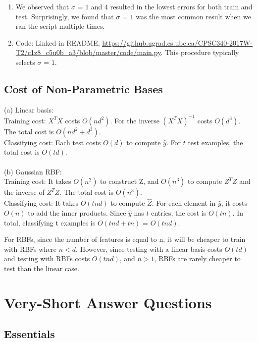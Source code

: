 \documentclass{article}
\def\enum#1{\begin{enumerate}#1\end{enumerate}}
\begin{document}
{\enum{
\item We observed that $\sigma$ = $1$ and $4$ resulted in the lowest errors for both train and test. Surprisingly, we found that $\sigma$ = $1$ was the most common result when we ran the script multiple times.
\item 
Code: Linked in README, \url{https://github.ugrad.cs.ubc.ca/CPSC340-2017W-T2/c1z8_c5u0b_a3/blob/master/code/main.py}.
This procedure typically selects $\sigma$ = $1$. 
}

\subsection{Cost of Non-Parametric Bases}

(a) Linear basis: 
\\ Training cost: $X^TX$ costs $O(nd^2)$. For the inverse $(X^TX)^{-1}$ costs $O(d^3)$. The total cost is $O(nd^2 + d^3)$.
\\ Classifying cost: Each test costs $O(d)$ to compute $\hat y$. For $t$ test examples, the total cost is $O(td)$. \\
\\ (b) Gaussian RBF:
\\ Training cost: It takes $O(n^2)$ to construct Z, and $O(n^3)$ to compute $Z^TZ$ and the inverse of $Z^TZ$. The total cost is $O(n^3)$.
\\ Classifying cost: It takes $O(tnd)$ to compute $\hat Z$. For each element in $\hat y$, it costs $O(n)$ to add the inner products. Since $\hat y$ has $t$ entries, the cost is $O(tn)$. In total, classifying t examples is $O(tnd + tn)$ = $O(tnd)$.

{\centering For RBFs, since the number of features is equal to n, it will be cheaper to train with RBFs where $n < d$. However, since testing with a linear basis costs $O(td)$ and testing with RBFs costs $O(tnd)$, and $n > 1$, RBFs are rarely cheaper to test than the linear case. }

\section{Very-Short Answer Questions}

\subsection{Essentials}

}
\end{document}
